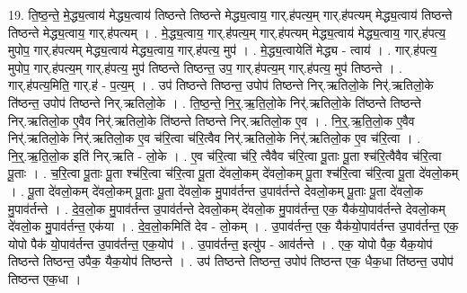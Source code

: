 \documentclass[17pt]{extarticle}
\begin{document}
19. ति॒ष्ठ॒न्ते॒ मे॒द्ध्य॒त्वाय॑ मेद्ध्य॒त्वाय॑ तिष्ठन्ते तिष्ठन्ते मेद्ध्य॒त्वाय॒ गार्.ह॑पत्य॒म् गार्.ह॑पत्यम् मेद्ध्य॒त्वाय॑ तिष्ठन्ते तिष्ठन्ते मेद्ध्य॒त्वाय॒ गार्.ह॑पत्यम् । . मे॒द्ध्य॒त्वाय॒ गार्.ह॑पत्य॒म् गार्.ह॑पत्यम् मेद्ध्य॒त्वाय॑ मेद्ध्य॒त्वाय॒ गार्.ह॑पत्य॒ मुपोप॒ गार्.ह॑पत्यम् मेद्ध्य॒त्वाय॑ मेद्ध्य॒त्वाय॒ गार्.ह॑पत्य॒ मुप॑ । . मे॒द्ध्य॒त्वायेति॑ मेद्ध्य - त्वाय॑ । . गार्.ह॑पत्य॒ मुपोप॒ गार्.ह॑पत्य॒म् गार्.ह॑पत्य॒ मुप॑ तिष्ठन्ते तिष्ठन्त॒ उप॒ गार्.ह॑पत्य॒म् गार्.ह॑पत्य॒ मुप॑ तिष्ठन्ते । . गार्.ह॑पत्य॒मिति॒ गार्.ह॑ - प॒त्य॒म् । . उप॑ तिष्ठन्ते तिष्ठन्त॒ उपोप॑ तिष्ठन्ते निर्.ऋतिलो॒के निर्॑.ऋतिलो॒के ति॑ष्ठन्त॒ उपोप॑ तिष्ठन्ते निर्.ऋतिलो॒के । . ति॒ष्ठ॒न्ते॒ नि॒र्॒.ऋ॒ति॒लो॒के निर्॑.ऋतिलो॒के ति॑ष्ठन्ते तिष्ठन्ते निर्.ऋतिलो॒क ए॒वैव निर्॑.ऋतिलो॒के ति॑ष्ठन्ते तिष्ठन्ते निर्.ऋतिलो॒क ए॒व । . नि॒र्॒.ऋ॒ति॒लो॒क ए॒वैव निर्॑.ऋतिलो॒के निर्॑.ऋतिलो॒क ए॒व च॑रि॒त्वा च॑रि॒त्वैव निर्॑.ऋतिलो॒के निर्॑.ऋतिलो॒क ए॒व च॑रि॒त्वा । . नि॒र्॒.ऋ॒ति॒लो॒क इति॑ निर्.ऋति - लो॒के । . ए॒व च॑रि॒त्वा च॑रि॒ त्वैवैव च॑रि॒त्वा पू॒ताः पू॒ता श्च॑रि॒त्वैवैव च॑रि॒त्वा पू॒ताः । . च॒रि॒त्वा पू॒ताः पू॒ता श्च॑रि॒त्वा च॑रि॒त्वा पू॒ता दे॑वलो॒कम् दे॑वलो॒कम् पू॒ता श्च॑रि॒त्वा च॑रि॒त्वा पू॒ता दे॑वलो॒कम् । . पू॒ता दे॑वलो॒कम् दे॑वलो॒कम् पू॒ताः पू॒ता दे॑वलो॒क मु॒पाव॑र्तन्त उ॒पाव॑र्तन्ते देवलो॒कम् पू॒ताः पू॒ता दे॑वलो॒क मु॒पाव॑र्तन्ते । . दे॒व॒लो॒क मु॒पाव॑र्तन्त उ॒पाव॑र्तन्ते देवलो॒कम् दे॑वलो॒क मु॒पाव॑र्तन्त॒ एक॒ यैक॑यो॒पाव॑र्तन्ते देवलो॒कम् दे॑वलो॒क मु॒पाव॑र्तन्त॒ एक॑या । . दे॒व॒लो॒कमिति॑ देव - लो॒कम् । . उ॒पाव॑र्तन्त॒ एक॒ यैक॑यो॒पाव॑र्तन्त उ॒पाव॑र्तन्त॒ एक॒ योपो पैक॑ यो॒पाव॑र्तन्त उ॒पाव॑र्तन्त॒ एक॒योप॑ । . उ॒पाव॑र्तन्त॒ इत्यु॑प - आव॑र्तन्ते । . एक॒ योपो पैक॒ यैक॒योप॑ तिष्ठन्ते तिष्ठन्त॒ उपैक॒ यैक॒योप॑ तिष्ठन्ते । . उप॑ तिष्ठन्ते तिष्ठन्त॒ उपोप॑ तिष्ठन्त एक॒ धैक॒धा ति॑ष्ठन्त॒ उपोप॑ तिष्ठन्त एक॒धा । \newline
\end{document}
